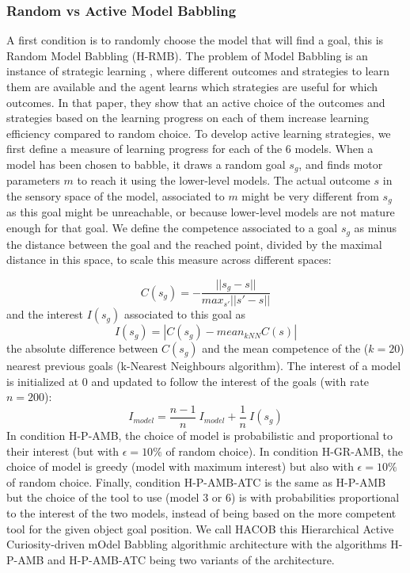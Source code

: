 \documentclass[10pt,letterpaper]{article}
\begin{document}
		
		\subsubsection{Random vs Active Model Babbling}
		
			A first condition is to randomly choose the model that will find a goal, this is Random Model Babbling (H-RMB).
			The problem of Model Babbling is an instance of strategic learning \cite{nguyen2012}, 
			where different outcomes and strategies to learn them are available and the agent learns which strategies are useful for which outcomes.
			In that paper, they show that an active choice of the outcomes and strategies based on the learning progress on each of them increase learning efficiency compared to random choice.
			To develop active learning strategies, we first define a measure of learning progress for each of the $6$ models.
			When a model has been chosen to babble, it draws a random goal $s_g$, and finds motor parameters $m$ to reach it using the lower-level models.
			The actual outcome $s$ in the sensory space of the model, associated to $m$ might be very different from $s_g$ as this goal might be unreachable, or because lower-level models are not mature enough for that goal.
			We define the competence associated to a goal $s_g$ as minus the distance between the goal and the reached point, divided by the maximal distance in this space, to scale this measure across different spaces:
			
			\begin{equation}
				C(s_g)=-\frac{||s_g-s||}{max_{s'}||s'-s||}
			\end{equation}
			 and the interest $I(s_g)$ associated to this goal as 
			\begin{equation}
				I(s_g) = |C(s_g) - mean_{kNN}C(s)|
			\end{equation}
			the absolute difference between $C(s_g)$ and the mean competence of the ($k=20$) nearest previous goals (k-Nearest Neighbours algorithm).
			The interest of a model is initialized at $0$ and updated to follow the interest of the goals (with rate $n=200$):
			\begin{equation}
				I_{model}=\frac{n-1}{n}~I_{model} + \frac{1}{n}~I(s_g)
			\end{equation}
			In condition H-P-AMB, the choice of model is probabilistic and proportional to their interest (but with $\epsilon=10\%$ of random choice). 
			In condition H-GR-AMB, the choice of model is greedy (model with maximum interest) but also with $\epsilon=10\%$ of random choice.
			Finally, condition H-P-AMB-ATC is the same as H-P-AMB but the choice of the tool to use (model $3$ or $6$) is with probabilities proportional to the interest of the two models, 
			instead of being based on the more competent tool for the given object goal position.
			We call HACOB this Hierarchical Active Curiosity-driven mOdel Babbling algorithmic architecture with the algorithms H-P-AMB and H-P-AMB-ATC being two variants of the architecture.
\end{document}
